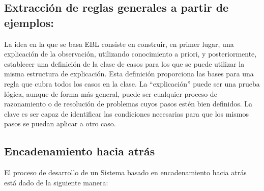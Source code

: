 \documentclass[12 pt, a4paper]{article}
\begin{document}
	 		\subsection{Extracción de reglas generales a partir de ejemplos:}
			La idea en la que se basa EBL consiste en construir, en primer lugar, una explicación de la observación, utilizando conocimiento a priori, y posteriormente, establecer una definición de la clase de casos para los que se puede utilizar la misma estructura de explicación. Esta definición proporciona las bases para una regla que cubra todos los casos en la clase. La ``explicación'' puede ser una prueba lógica, aunque de forma más general, puede ser cualquier proceso de razonamiento o de resolución de problemas cuyos pasos estén bien definidos. La clave es ser capaz de identificar las condiciones necesarias para que los mismos pasos se puedan aplicar a otro caso.
			
			\subsection{Encadenamiento hacia atrás}
			El proceso de desarrollo de un Sistema basado en encadenamiento hacia atrás está dado de la siguiente manera:
\end{document}

